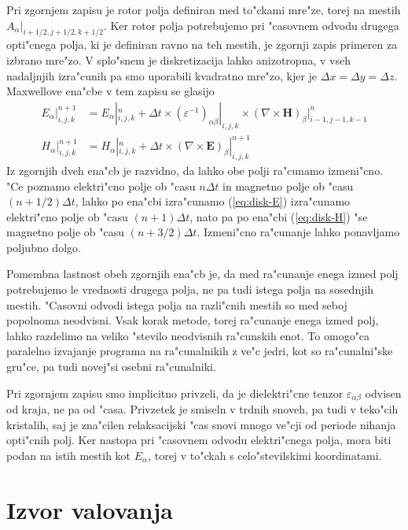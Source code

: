 \documentclass[12pt,twoside,openright,final]{report}
\renewcommand{\vec}{\mathbf}
\begin{document}
Pri zgornjem zapisu je rotor polja definiran med to"ckami mre"ze, torej na mestih $A_\alpha|_{i+1/2,j+1/2,k+1/2}$. 
Ker rotor polja potrebujemo pri "casovnem odvodu drugega opti"cnega polja, ki je definiran ravno na teh mestih, je zgornji zapis primeren za izbrano mre"zo. 
V splo"snem je diskretizacija lahko anizotropna, v vseh nadaljnjih izra"cunih pa smo uporabili kvadratno mre"zo, kjer je $\Delta x = \Delta y = \Delta z$. 
Maxwellove ena"cbe v tem zapisu se glasijo
\begin{align}
 E_\alpha|_{i,j,k}^{n+1} &= E_\alpha|_{i,j,k}^n + \Delta t \times (\varepsilon^{-1})_{\alpha\beta}|_{i,j,k} \times (\nabla\times \vec H)_\beta|_{i-1,j-1,k-1}^{n} \label{eq:disk-E}\\
 H_\alpha|_{i,j,k}^{n+1} &= H_\alpha|_{i,j,k}^n + \Delta t \times (\nabla\times \vec E)_\beta|_{i,j,k}^{n+1} \label{eq:disk-H}
\end{align}
Iz zgornjih dveh ena"cb je razvidno, da lahko obe polji ra"cunamo izmeni"cno. 
"Ce poznamo elektri"cno polje ob "casu $n\Delta t$ in magnetno polje ob "casu $(n+1/2)\Delta t$, lahko po ena"cbi izra"cunamo (\ref{eq:disk-E}) izra"cunamo elektri"cno polje ob "casu $(n+1)\Delta t$, nato pa po ena"cbi (\ref{eq:disk-H}) "se magnetno polje ob "casu $(n+3/2)\Delta t$. Izmeni"cno ra"cunanje lahko ponavljamo poljubno dolgo. 

Pomembna lastnost obeh zgornjih ena"cb je, da med ra"cunanje enega izmed polj potrebujemo le vrednosti drugega polja, ne pa tudi istega polja na sosednjih mestih. 
"Casovni odvodi istega polja na razli"cnih mestih so med seboj popolnoma neodvisni. 
Vsak korak metode, torej ra"cunanje enega izmed polj, lahko razdelimo na veliko "stevilo neodvisnih ra"cunskih enot. 
To omogo"ca paralelno izvajanje programa na ra"cunalnikih z ve"c jedri, kot so ra"cunalni"ske gru"ce, pa tudi novej"si osebni ra"cunalniki. 

Pri zgornjem zapisu smo implicitno privzeli, da je dielektri"cne tenzor $\varepsilon_{\alpha\beta}$ odvisen od kraja, ne pa od "casa. 
Privzetek je smiseln v trdnih snoveh, pa tudi v teko"cih kristalih, saj je zna"cilen relaksacijski "cas snovi mnogo ve"cji od periode nihanja opti"cnih polj. 
Ker nastopa pri "casovnem odvodu elektri"cnega polja, mora biti podan na istih mestih kot $E_\alpha$, torej v to"ckah s celo"stevilskimi koordinatami. 

\section{Izvor valovanja}
\end{document}
